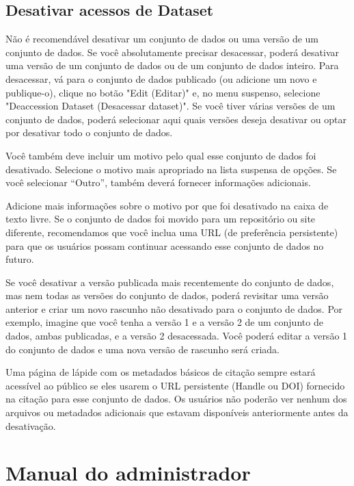 \documentclass[12pt,hidelinks]{article}
\begin{document}
    \subsection{Desativar acessos de Dataset}
    
\qquad Não é recomendável desativar um conjunto de dados ou uma versão de um conjunto de dados. Se você absolutamente precisar desacessar, poderá desativar uma versão de um conjunto de dados ou de um conjunto de dados inteiro.
Para desacessar, vá para o conjunto de dados publicado (ou adicione um novo e publique-o), clique no botão "Edit (Editar)" e, no menu suspenso, selecione "Deaccession Dataset (Desacessar dataset)". Se você tiver várias versões de um conjunto de dados, poderá selecionar aqui quais versões deseja desativar ou optar por desativar todo o conjunto de dados.

Você também deve incluir um motivo pelo qual esse conjunto de dados foi desativado. Selecione o motivo mais apropriado na lista suspensa de opções. Se você selecionar “Outro”, também deverá fornecer informações adicionais.

Adicione mais informações sobre o motivo por que foi desativado na caixa de texto livre. Se o conjunto de dados foi movido para um repositório ou site diferente, recomendamos que você inclua uma URL (de preferência persistente) para que os usuários possam continuar acessando esse conjunto de dados no futuro.

Se você desativar a versão publicada mais recentemente do conjunto de dados, mas nem todas as versões do conjunto de dados, poderá revisitar uma versão anterior e criar um novo rascunho não desativado para o conjunto de dados. Por exemplo, imagine que você tenha a versão 1 e a versão 2 de um conjunto de dados, ambas publicadas, e a versão 2 desacessada. Você poderá editar a versão 1 do conjunto de dados e uma nova versão de rascunho será criada.

Uma página de lápide com os metadados básicos de citação sempre estará acessível ao público se eles usarem o URL persistente (Handle ou DOI) fornecido na citação para esse conjunto de dados. Os usuários não poderão ver nenhum dos arquivos ou metadados adicionais que estavam disponíveis anteriormente antes da desativação.
        
\newpage

\section{Manual do administrador}
\vspace{10.5cm}
\end{document}
